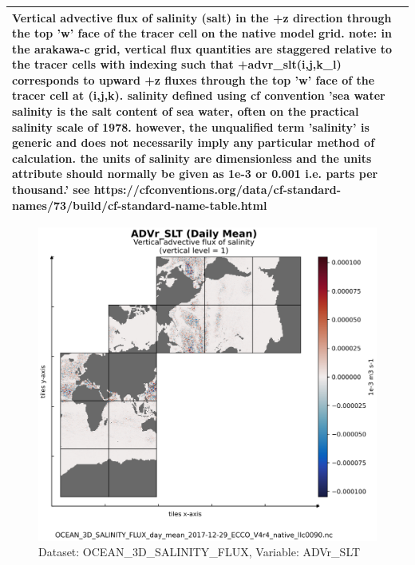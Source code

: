 \begin{longtable}{|m{}|m{}|m{}|m{}|}
\multicolumn{4}{|p{1\textwidth}|}{\footnotesize{{Vertical advective flux of salinity (salt) in the +z direction through the top 'w' face of the tracer cell on the native model grid. note: in the arakawa-c grid, vertical flux quantities are staggered relative to the tracer cells with indexing such that +advr\_slt(i,j,k\_l) corresponds to upward +z fluxes through the top 'w' face of the tracer cell at (i,j,k). salinity defined using cf convention 'sea water salinity is the salt content of sea water, often on the practical salinity scale of 1978. however, the unqualified term 'salinity' is generic and does not necessarily imply any particular method of calculation. the units of salinity are dimensionless and the units attribute should normally be given as 1e-3 or 0.001 i.e. parts per thousand.' see https://cfconventions.org/data/cf-standard-names/73/build/cf-standard-name-table.html}}} \\ \hline
\end{longtable}

\begin{figure}[H]
\centering
\includegraphics[scale=0.55]{../images/plots/v4r4/native_plots/Ocean_Three-Dimensional_Salinity_Fluxes/ADVr_SLT.png}
\caption{Dataset: OCEAN\_3D\_SALINITY\_FLUX, Variable: ADVr\_SLT}
\label{tab:table-OCEAN_3D_SALINITY_FLUX_ADVr_SLT-Plot}
\end{figure}
\newpage
\pagebreak
